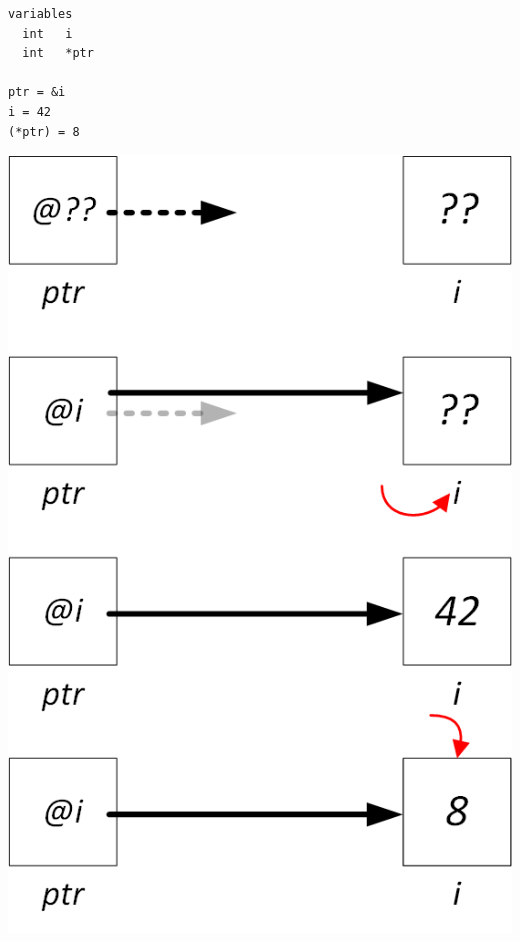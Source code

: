 \documentclass[11pt,a4paper]{article}
\begin{document}
\begin{table}[h!]
  \centering
  \begin{minipage}{0.45\textwidth}
    \centering
\begin{lstlisting}[style=algorithmique]
variables
  int   i
  int   *ptr

ptr = &i
i = 42
(*ptr) = 8 \end{lstlisting}
  \end{minipage}
  \hfillx
  \begin{minipage}{0.5\textwidth}
    \centering
\includegraphics[scale=0.75]{img/pointeurs/pointeurs0_3_references.png}
  \end{minipage}
\end{table}
\end{document}
